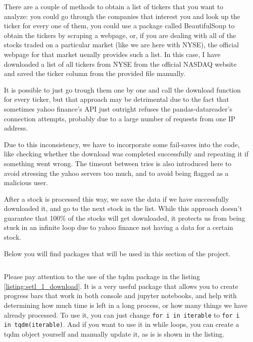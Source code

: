 \documentclass[12pt, a4paper]{article}
\begin{document}
There are a couple of methods to obtain a list of tickers that you want to analyze: you could go through the companies that interest you and look up the ticker for every one of them, you could use a package called BeautifulSoup to obtain the tickers by scraping a webpage, or, if you are dealing with all of the stocks traded on a particular market (like we are here with NYSE), the official webpage for that market usually provides such a list. In this case, I have downloaded a list of all tickers from NYSE from the official NASDAQ website \cite{nasdaq_companylist} and saved the ticker column from the provided file  manually.

It is possible to just go trough them one by one and call the download function for every ticker, but that approach may be detrimental due to the fact that sometimes yahoo finance’s API  just outright refuses the pandas-datareader’s connection attempts, probably due to a large number of requests from one IP address.

Due to this inconsistency, we have to incorporate some fail-saves into the code, like checking whether the download was completed successfully and repeating it if something went wrong. The timeout between tries is also introduced here to avoid stressing the yahoo servers too much, and to avoid being flagged as a malicious user.

After a stock is processed this way, we save the data if we have successfully downloaded it, and go to the next stock in the list. While this approach doesn’t guarantee that 100\% of the stocks will get downloaded, it protects us from being stuck in an infinite loop due to yahoo finance not having a data for a certain stock.


Below you will find packages that will be used in this section of the project.

\bgroup
  \inputminted[linenos, breaklines=true, fontsize=\scriptsize, firstnumber=last]{python}{src/stocks/etl/0a_imports.py}
  \label{listing:setl_0a_imports}
\egroup



Please pay attention to the use of the tqdm package in the listing \ref{listing:setl_1_download}. It is a very useful package that allows you to create progress bars that work in both console and jupyter notebooks, and help with determining how much time is left in a long process, or how many things we have already processed. To use it, you can just change \texttt{for i in iterable} to \texttt{for i in tqdm(iterable)}. And if you want to use it in while loops, you can create a tqdm object yourself and manually update it, as is is shown in the listing.
\end{document}
